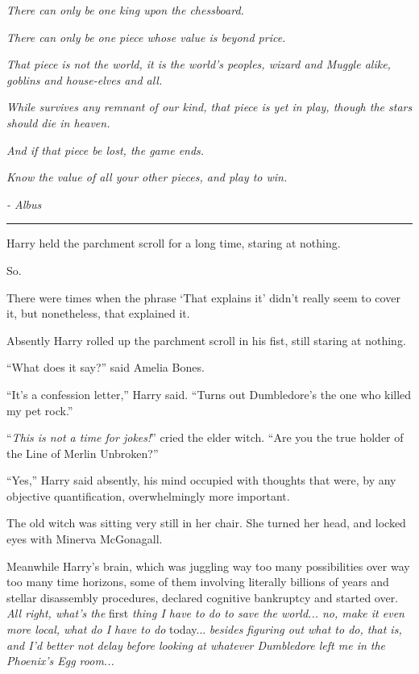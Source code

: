 \emph{There can only be one king upon the chessboard.}

\emph{There can only be one piece whose value is beyond price.}

\emph{That piece is not the world, it is the world's peoples, wizard and Muggle alike, goblins and house-elves and all.}

\emph{While survives any remnant of our kind, that piece is yet in play, though the stars should die in heaven.}

\emph{And if that piece be lost, the game ends.}

\emph{Know the value of all your other pieces, and play to win.}

\emph{- Albus}

\begin{center}\rule{3in}{0.4pt}\end{center}

Harry held the parchment scroll for a long time, staring at nothing.

So.

There were times when the phrase `That explains it' didn't really seem to cover it, but nonetheless, that explained it.

Absently Harry rolled up the parchment scroll in his fist, still staring at nothing.

``What does it say?'' said Amelia Bones.

``It's a confession letter,'' Harry said. ``Turns out Dumbledore's the one who killed my pet rock.''

``\emph{This is not a time for jokes!}'' cried the elder witch. ``Are you the true holder of the Line of Merlin Unbroken?''

``Yes,'' Harry said absently, his mind occupied with thoughts that were, by any objective quantification, overwhelmingly more important.

The old witch was sitting very still in her chair. She turned her head, and locked eyes with Minerva McGonagall.

Meanwhile Harry's brain, which was juggling way too many possibilities over way too many time horizons, some of them involving literally billions of years and stellar disassembly procedures, declared cognitive bankruptcy and started over. \emph{All right, what's the} first \emph{thing I have to do to save the world... no, make it even more local, what do I have to do} today... \emph{besides figuring out what to do, that is, and I'd better not delay before looking at whatever Dumbledore left me in the Phoenix's Egg room...}

